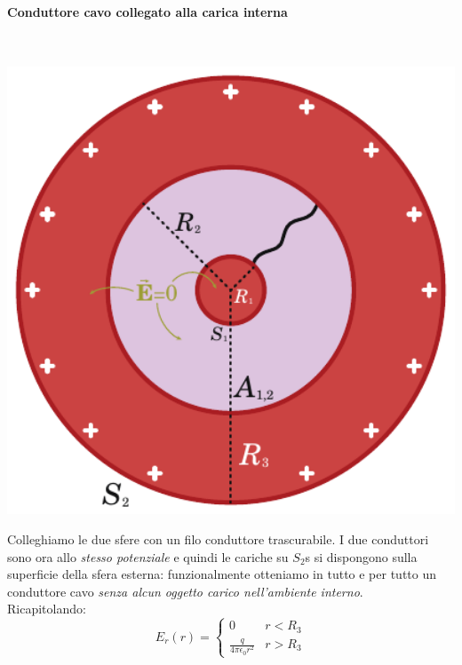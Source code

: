 \paragraph{Conduttore cavo collegato alla carica interna}~\\
\begin{minipage}{0.43\textwidth}
	\begin{center}
		\includegraphics[width=1\textwidth]{images/chp4/chp4sferacavaconsferacollegata.pdf}
	\end{center}
\end{minipage}\hspace{10pt}
\begin{minipage}{0.56\textwidth}
	Colleghiamo le due sfere con un filo conduttore trascurabile. I due conduttori sono ora allo \textit{stesso potenziale} e quindi le cariche su $S_2$s si dispongono sulla superficie della sfera esterna: funzionalmente otteniamo in tutto e per tutto un conduttore cavo \textit{senza alcun oggetto carico nell'ambiente interno}.\\
	Ricapitolando:
	\begin{equation*}
		E_{r}(r)=\begin{cases}
			0 & r<R_3\\
			\frac{q}{4\pi\epsilon_0 r^2} & r>R_3
		\end{cases}
	\end{equation*}
\end{minipage}\\
